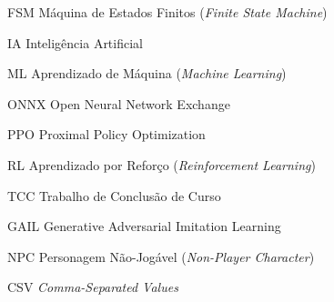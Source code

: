 \documentclass[
    12pt,                %
    openright,           %
    oneside,             %
    a4paper,             %
    chapter=TITLE,       %
    section=TITLE,       %
    english,             %
    brazil               %
]{abntex2}
\begin{document}
\begin{siglas}
    \item[FSM]   Máquina de Estados Finitos (\textit{Finite State Machine})
    \item[IA]    Inteligência Artificial
    \item[ML]    Aprendizado de Máquina (\textit{Machine Learning})
    \item[ONNX]  Open Neural Network Exchange
    \item[PPO]   Proximal Policy Optimization
    \item[RL]    Aprendizado por Reforço (\textit{Reinforcement Learning})
    \item[TCC]   Trabalho de Conclusão de Curso
    \item[GAIL]  Generative Adversarial Imitation Learning
    \item[NPC]   Personagem Não-Jogável (\textit{Non-Player Character})
    \item[CSV]   \textit{Comma-Separated Values}
\end{siglas}

\tableofcontents*
\cleardoublepage

\textual










\postextual



%     

%     
\end{document}
